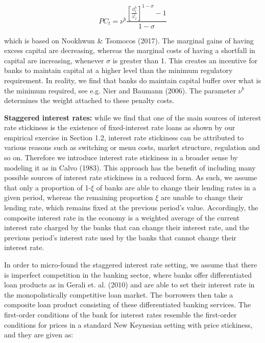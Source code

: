 \documentclass[12pt]{article}
\numberwithin{equation}{section}
\begin{document}
\begin{equation}
PC_t=\nu^b \frac{[\frac{\phi^b_t}{\bar{\varphi_t}}]^{1-\sigma}-1}{{1-\sigma}}
\end{equation}

which is based on Nookhwun \& Tsomocos (2017). The marginal gains of having excess capital are decreasing, whereas the marginal costs of having a shortfall in capital are increasing, whenever $\sigma$ is greater than 1. This creates an incentive for banks to maintain capital at a higher level than the minimum regulatory requirement. In reality, we find that banks do maintain capital buffer over what is the minimum required, see e.g. Nier and Baumann (2006). The parameter $\nu^b$ determines the weight attached to these penalty costs.



\textbf{Staggered interest rates:} while we find that one of the main sources of interest rate stickiness is the existence of fixed-interest rate loans as shown by our empirical exercise in Section 1.2, interest rate stickiness can be attributed to various reasons such as switching or menu costs, market structure, regulation and so on. Therefore we introduce interest rate stickiness in a broader sense by modeling it as in Calvo (1983). This approach has the benefit of including many possible sources of interest rate stickiness in a reduced form. As such, we assume that only a proportion of 1-$\xi$ of banks are able to change their lending rates in a given period, whereas the remaining proportion $\xi$ are unable to change their lending rate, which remains fixed at the previous period's value. Accordingly, the composite interest rate in the economy is a weighted average of the current interest rate charged by the banks that can change their interest rate, and the previous period's interest rate used by the banks that cannot change their interest rate. 

In order to micro-found the staggered interest rate setting, we assume that there is imperfect competition in the banking sector, where banks offer differentiated loan products as in Gerali et. al. (2010) and are able to set their interest rate in the monopolistically competitive loan market. The borrowers then take a composite loan product consisting of these differentiated banking services. The first-order conditions of the bank for interest rates resemble the first-order conditions for prices in a standard New Keynesian setting with price stickiness, and they are given as: 
\end{document}

